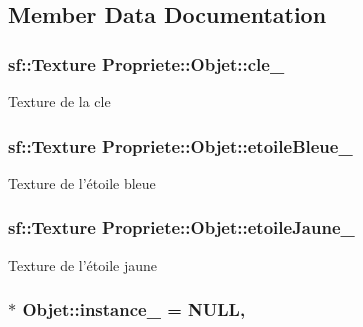 \subsection{Member Data Documentation}
\hypertarget{classPropriete_1_1Objet_a9ce6e8537fa7a4687885d32e284f7ddf}{
\subsubsection[{cle\-\_\-}]{\setlength{\rightskip}{0pt plus 5cm}sf\-::\-Texture Propriete\-::\-Objet\-::cle\-\_\-\hspace{0.3cm}{\ttfamily [private]}}}\label{classPropriete_1_1Objet_a9ce6e8537fa7a4687885d32e284f7ddf}
Texture de la cle \hypertarget{classPropriete_1_1Objet_a769b3717d9f8caf4c81bd10229e9d000}{
\subsubsection[{etoile\-Bleue\-\_\-}]{\setlength{\rightskip}{0pt plus 5cm}sf\-::\-Texture Propriete\-::\-Objet\-::etoile\-Bleue\-\_\-\hspace{0.3cm}{\ttfamily [private]}}}\label{classPropriete_1_1Objet_a769b3717d9f8caf4c81bd10229e9d000}
Texture de l'étoile bleue \hypertarget{classPropriete_1_1Objet_a7d4658bf0769bba02c88f14357cf5f9d}{
\subsubsection[{etoile\-Jaune\-\_\-}]{\setlength{\rightskip}{0pt plus 5cm}sf\-::\-Texture Propriete\-::\-Objet\-::etoile\-Jaune\-\_\-\hspace{0.3cm}{\ttfamily [private]}}}\label{classPropriete_1_1Objet_a7d4658bf0769bba02c88f14357cf5f9d}
Texture de l'étoile jaune \hypertarget{classPropriete_1_1Objet_af3942f5bf48c0bc6e5bf6d85ceddc9ff}{
\subsubsection[{instance\-\_\-}]{ $\ast$ Objet\-::instance\-\_\- = N\-U\-L\-L\hspace{0.3cm}{\ttfamily [static]}, {\ttfamily [private]}}}\label{classPropriete_1_1Objet_af3942f5bf48c0bc6e5bf6d85ceddc9ff}
